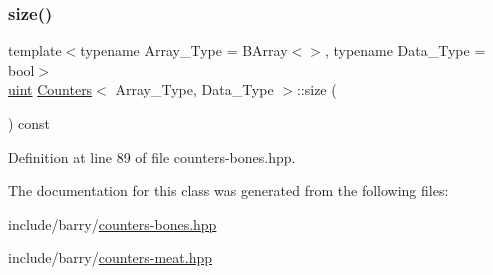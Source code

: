 \subsubsection{\texorpdfstring{size()}{size()}}
{\footnotesize\ttfamily template$<$typename Array\+\_\+\+Type = B\+Array$<$$>$, typename Data\+\_\+\+Type = bool$>$ \\
\hyperlink{typedefs_8hpp_a91ad9478d81a7aaf2593e8d9c3d06a14}{uint} \hyperlink{class_counters}{Counters}$<$ Array\+\_\+\+Type, Data\+\_\+\+Type $>$\+::size (\begin{DoxyParamCaption}{ }\end{DoxyParamCaption}) const\hspace{0.3cm}{\ttfamily [inline]}}



Definition at line 89 of file counters-\/bones.\+hpp.



The documentation for this class was generated from the following files\+:\begin{DoxyCompactItemize}
\item 
include/barry/\hyperlink{counters-bones_8hpp}{counters-\/bones.\+hpp}\item 
include/barry/\hyperlink{counters-meat_8hpp}{counters-\/meat.\+hpp}\end{DoxyCompactItemize}
